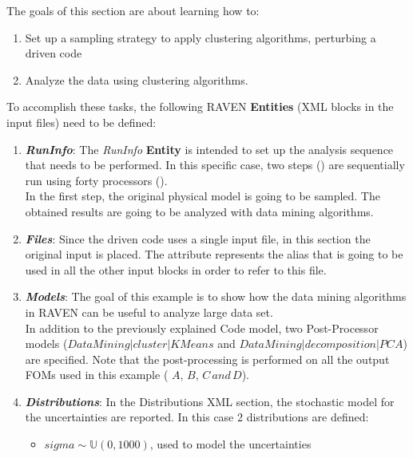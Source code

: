 The goals of this section are about learning how to:
 \begin{enumerate}
   \item Set up a sampling strategy to apply clustering algorithms, perturbing a driven code
  \item Analyze the data using clustering algorithms.
\end{enumerate}
To accomplish these tasks, the following RAVEN \textbf{Entities} (XML blocks in the input files) need to be defined:
\begin{enumerate}
   \item \textbf{\textit{RunInfo}}:
   The \textit{RunInfo} \textbf{Entity} is intended  to set up the analysis sequence that
   needs to be performed. In this specific case, two steps  () are sequentially run
   using forty processors ().
   \\In the first step, the original physical model is going to be sampled.
   The obtained results are going to be analyzed with data mining
   algorithms.
   \item \textbf{\textit{Files}}:
   Since the driven code uses a single input file, in this section the original input is placed. The attribute   represents the alias that is going to be
   used in all the other input blocks in order to refer to this file.
   \item \textbf{\textit{Models}}:
 The goal of this example is to show how the
 data mining algorithms in RAVEN can be useful to analyze large data set.
 \\In addition to the previously explained Code
 model, two Post-Processor models ($DataMining|cluster|KMeans$ and $DataMining|decomposition|PCA$) are specified.
Note that the post-processing is
performed on all the output FOMs used in this example ( $A,\, B,\, C \, and \, D$).
   \item \textbf{\textit{Distributions}}:
  In the Distributions XML section, the stochastic model for the
  uncertainties are reported. In
  this case 2 distributions are defined:
  \begin{itemize}
    \item $sigma \sim \mathbb{U}(0,1000)$, used to model the uncertainties

\end{itemize}
\end{enumerate}
